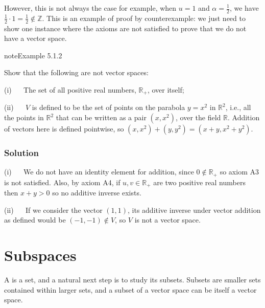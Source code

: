 \documentclass[letterpaper,10pt,english]{jupyterBook}
\begin{document}
\sphinxAtStartPar
However, this is not always the case \sphinxhyphen{} for example, when \(u=1\) and \(\alpha = \frac{1}{2}\), we have \(\frac{1}{2} \cdot 1 = \frac{1}{2} \notin \mathbb{Z}\). This is an example of proof by counterexample: we just need to show one instance where the axioms are not satisfied to prove that we do not have a vector space.
\label{_pages/5.1_Vector_spaces_definitions:non-vector-space-example}
\begin{sphinxadmonition}{note}{Example 5.1.2}



\sphinxAtStartPar
Show that the following are not vector spaces:

\sphinxAtStartPar
(i)   The set of all positive real numbers, \(\mathbb{R}_+\), over itself;

\sphinxAtStartPar
(ii)   \(V\) is defined to be the set of points on the parabola \(y=x^2\) in \(\mathbb{R}^2\), i.e., all the points in \(\mathbb{R}^2\) that can be written as a pair \((x, x^2)\), over the field \(\mathbb{R}\). Addition of vectors here is defined pointwise, so \((x, x^2) + (y, y^2) = (x+y, x^2 + y^2)\).
\subsubsection*{Solution}

\sphinxAtStartPar
(i)   We do not have an identity element for addition, since \(0 \notin \mathbb{R}_+\) so axiom A3 is not satisfied. Also, by axiom A4, if \(u, v \in \mathbb{R}_+\) are two positive real numbers then \(x + y > 0\) so no additive inverse exists.

\sphinxAtStartPar
(ii)   If we consider the vector \((1, 1)\), its additive inverse under vector addition as defined would be \((-1, -1) \notin V\), so \(V\) is not a vector space.
\end{sphinxadmonition}



\sphinxstepscope

\ignorespaces 

\section{Subspaces}
\label{\detokenize{_pages/5.2_Subspaces:subspaces}}\label{\detokenize{_pages/5.2_Subspaces:index-0}}\label{\detokenize{_pages/5.2_Subspaces:subspaces-section}}\label{\detokenize{_pages/5.2_Subspaces::doc}}
\sphinxAtStartPar
A {\hyperref[\detokenize{_pages/5.1_Vector_spaces_definitions:vector-space-definition}]{}} is a set, and a natural next step is to study its subsets. Subsets are smaller sets contained within larger sets, and a subset of a vector space can be itself a vector space.
\end{document}
